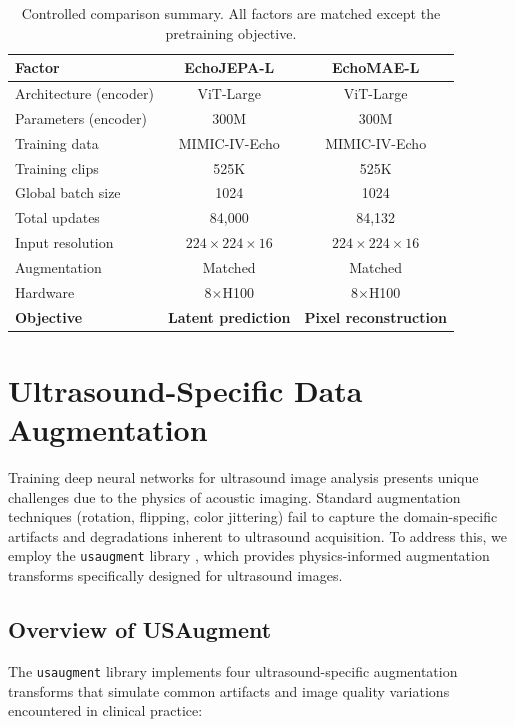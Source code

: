 \documentclass{article}
\theoremstyle{plain}
\theoremstyle{definition}
\theoremstyle{remark}
\begin{document}
\begin{table}[h]
\centering
\small
\begin{tabular}{lcc}
\toprule
\textbf{Factor} & \textbf{EchoJEPA-L} & \textbf{EchoMAE-L} \\
\midrule
Architecture (encoder) & ViT-Large & ViT-Large \\
Parameters (encoder) & 300M & 300M \\
Training data & MIMIC-IV-Echo & MIMIC-IV-Echo \\
Training clips & 525K & 525K \\
Global batch size & 1024 & 1024 \\
Total updates & 84,000 & 84,132 \\
Input resolution & $224 \times 224 \times 16$ & $224 \times 224 \times 16$ \\
Augmentation & Matched & Matched \\
Hardware & 8$\times$H100 & 8$\times$H100 \\
\midrule
\textbf{Objective} & \textbf{Latent prediction} & \textbf{Pixel reconstruction} \\
\bottomrule
\end{tabular}
\caption{Controlled comparison summary. All factors are matched except the pretraining objective.}
\label{tab:controlled-summary}
\end{table}

\section{Ultrasound-Specific Data Augmentation}
\label{appendix:usaugment}

Training deep neural networks for ultrasound image analysis presents unique challenges due to the physics of acoustic imaging. Standard augmentation techniques (rotation, flipping, color jittering) fail to capture the domain-specific artifacts and degradations inherent to ultrasound acquisition. To address this, we employ the \texttt{usaugment} library \cite{tupper2025}, which provides physics-informed augmentation transforms specifically designed for ultrasound images.

\subsection{Overview of USAugment}

The \texttt{usaugment} library implements four ultrasound-specific augmentation transforms that simulate common artifacts and image quality variations encountered in clinical practice:
\end{document}
